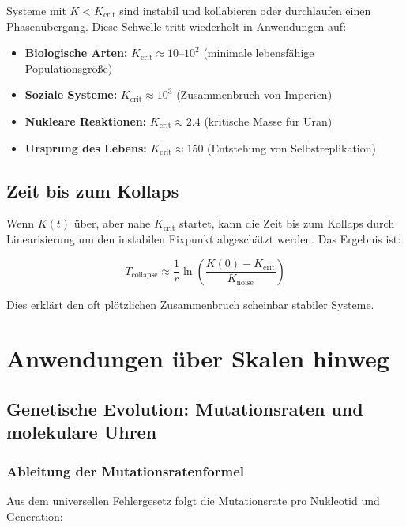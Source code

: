 \documentclass[12pt,a4paper]{article}
\theoremstyle{remark}
\newcommand{\Keffcrit}{K_{\mathrm{crit}}}
\begin{document}
	Systeme mit $K < \Keffcrit$ sind instabil und kollabieren oder durchlaufen einen Phasenübergang. Diese Schwelle tritt wiederholt in Anwendungen auf:
	
	\begin{itemize}
		\item \textbf{Biologische Arten:} $\Keffcrit \approx 10$--$10^2$ (minimale lebensfähige Populationsgröße)
		\item \textbf{Soziale Systeme:} $\Keffcrit \approx 10^3$ (Zusammenbruch von Imperien)
		\item \textbf{Nukleare Reaktionen:} $\Keffcrit \approx 2.4$ (kritische Masse für Uran)
		\item \textbf{Ursprung des Lebens:} $\Keffcrit \approx 150$ (Entstehung von Selbstreplikation)
	\end{itemize}
	
	\subsection{Zeit bis zum Kollaps}
	
	Wenn $K(t)$ über, aber nahe $\Keffcrit$ startet, kann die Zeit bis zum Kollaps durch Linearisierung um den instabilen Fixpunkt abgeschätzt werden. Das Ergebnis ist:
	
	\begin{equation}
		T_{\text{collapse}} \approx \frac{1}{r} \ln\left( \frac{K(0) - \Keffcrit}{K_{\text{noise}}} \right)
		\label{eq:collapse-time}
	\end{equation}
	
	Dies erklärt den oft plötzlichen Zusammenbruch scheinbar stabiler Systeme.
	
	\section{Anwendungen über Skalen hinweg}
	\label{sec:applications}
	
	\subsection{Genetische Evolution: Mutationsraten und molekulare Uhren}
	\label{subsec:genetic}
	
	\subsubsection{Ableitung der Mutationsratenformel}
	
	Aus dem universellen Fehlergesetz folgt die Mutationsrate pro Nukleotid und Generation:
	
\end{document}
